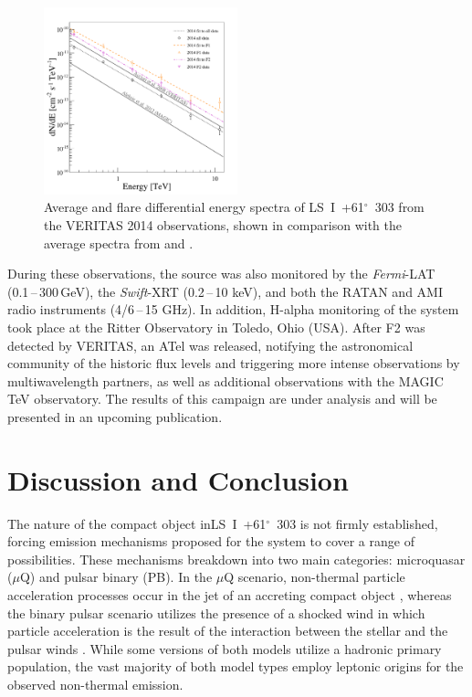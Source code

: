 \documentclass[preprint2]{aastex}
\newcommand{\lsi}{LS~I~+61$^{\circ}$~303}
\newcommand{\gev}{\,GeV}
\begin{document}
\begin{figure}[ht]
\centering
\includegraphics[width=0.5\textwidth]{figs/all_spectra_coloured.pdf}
\caption{Average and flare differential energy spectra of \lsi{} from the VERITAS 2014 observations, shown in comparison with the average spectra from \citet{VERITASLSIDetection} and \citet{Aleksic}.}
\label{spec}
\end{figure}

During these observations, the source was also monitored by the \emph{Fermi}-LAT (0.1\,--\,300\gev{}), the \emph{Swift}-XRT (0.2\,--\,10 keV), and both the RATAN and AMI radio instruments (4/6\,--\,15 GHz). In addition, H-alpha monitoring of the system took place at the Ritter Observatory in Toledo, Ohio (USA). After F2 was detected by VERITAS, an ATel \citep{2015VTSATEL} was released, notifying the astronomical community of the historic flux levels and triggering more intense observations by multiwavelength partners, as well as additional observations with the MAGIC TeV observatory. The results of this campaign are under analysis and will be presented in an upcoming publication. 

\section{Discussion and Conclusion}
The nature of the compact object in\linebreak \lsi{} is not firmly established, forcing emission mechanisms proposed for the system to cover a range of possibilities. These mechanisms breakdown into two main categories: microquasar ($\mu$Q) and pulsar binary (PB). In the $\mu$Q scenario, non-thermal particle acceleration processes occur in the jet of an accreting compact object \citep{Massi2001,Massi2013,2015A&A...575L...9M}, whereas the binary pulsar scenario utilizes the presence of a shocked wind in which particle acceleration is the result of the interaction between the stellar and the pulsar winds \citep{Dhawan2006}. While some versions of both models utilize a hadronic primary population, the vast majority of both model types employ leptonic origins for the observed non-thermal emission.
\end{document}
